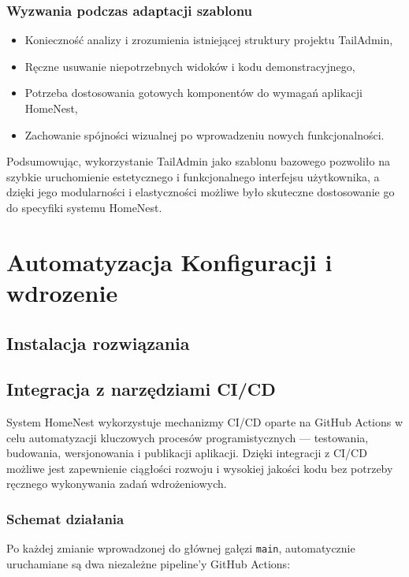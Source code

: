 \subsubsection{Wyzwania podczas adaptacji szablonu}
\begin{itemize}
    \item Konieczność analizy i zrozumienia istniejącej struktury projektu TailAdmin,
    \item Ręczne usuwanie niepotrzebnych widoków i kodu demonstracyjnego,
    \item Potrzeba dostosowania gotowych komponentów do wymagań aplikacji HomeNest,
    \item Zachowanie spójności wizualnej po wprowadzeniu nowych funkcjonalności.
\end{itemize}

Podsumowując, wykorzystanie TailAdmin jako szablonu bazowego pozwoliło na szybkie uruchomienie estetycznego i funkcjonalnego interfejsu użytkownika, a dzięki jego modularności i elastyczności możliwe było skuteczne dostosowanie go do specyfiki systemu HomeNest.


\section{Automatyzacja Konfiguracji i wdrozenie}

\subsection{Instalacja rozwiązania}


\subsection{Integracja z narzędziami CI/CD}
\label{sec:integracja_ci_cd}

System HomeNest wykorzystuje mechanizmy CI/CD oparte na GitHub Actions w celu automatyzacji kluczowych procesów programistycznych — testowania, budowania, wersjonowania i publikacji aplikacji. Dzięki integracji z CI/CD możliwe jest zapewnienie ciągłości rozwoju i wysokiej jakości kodu bez potrzeby ręcznego wykonywania zadań wdrożeniowych.

\subsubsection{Schemat działania}

Po każdej zmianie wprowadzonej do głównej gałęzi \texttt{main}, automatycznie uruchamiane są dwa niezależne pipeline'y GitHub Actions:

